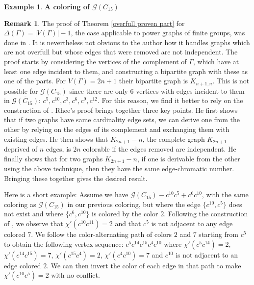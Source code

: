 \documentclass{article}
\theoremstyle{definition}
\newtheorem{example}[theorem]{Example}
\newtheorem*{remark}{Remark}
\theoremstyle{indentclaim}
\theoremstyle{named}
\theoremstyle{named}
\begin{document}
\begin{example}{\textbf{A coloring of $\mathscr{G}(C_{15})$}}
\begin{table}[ht]
{}
\end{table}

\end{example}

\bigskip

\begin{remark}

The proof of Theorem \ref{overfull proven part} for $\Delta(\Gamma) = |V(\Gamma)| - 1$, the case applicable to power graphs of finite groups, was done in \cite{Plantholt-1}. It is nevertheless not obvious to the author how it handles graphs which are not overfull but whose edges that were removed are not independent. The proof starts by considering the vertices of the complement of $\Gamma$, which have at least one edge incident to them, and constructing a bipartite graph with these as one of the parts. For $V(\Gamma) = 2n+1$ their bipartite graph is $K_{n+1, n}$. This is not possible for $\mathscr{G}(C_{15})$ since there are only $6$ vertices with edges incident to them in $\overline{\mathscr{G}(C_{15})}$: $c^5, c^{10}, c^3, c^6, c^9, c^{12}$. For this reason, we find it better to rely on the construction of \cite{Rhee}. Rhee's proof brings together three key points. He first shows that if two graphs have same cardinality edge sets, we can derive one from the other by relying on the edges of its complement and exchanging them with existing edges. He then shows that $K_{2n+1}-n$, the complete graph $K_{2n+1}$ deprived of $n$ edges, is $2n$ colorable if the edges removed are independent. He finally shows that for two graphs $K_{2n+1}-n$, if one is derivable from the other using the above technique, then they have the same edge-chromatic number. Bringing these together gives the desired result. 
\end{remark}
Here is a short example: 
Assume we have $\mathscr{G}(C_{15}) - c^{10}c^{5} + c^6 c^{10}$, with the same coloring as $\mathscr{G}(C_{15})$ in our previous coloring, but where the edge ${\{c^{10}, c^{5}\}}$ does not exist and where $\{c^6, c^{10}\}$ is colored by the color $2$. Following the construction of \cite{Rhee}, we observe that $\chi'(c^{10} c^{11}) = 2$ and that $c^5$ is not adjacent to any edge colored $7$. We follow the color-alternating path of colors $2$ and $7$ starting from $c^5$ to obtain the following vertex sequence: $c^5c^{14}c^{15}c^4c^{10}$ where $\chi'(c^5c^{14}) = 2$, $\chi'(c^{14}c^{15}) = 7$, $\chi'(c^{15}c^{4}) = 2$, $\chi'(c^4c^{10}) = 7$ and $c^{10}$ is not adjacent to an edge colored $2$. We can then invert the color of each edge in that path to make $\chi'(c^{10}c^5) = 2$ with no conflict. 
\end{document}
